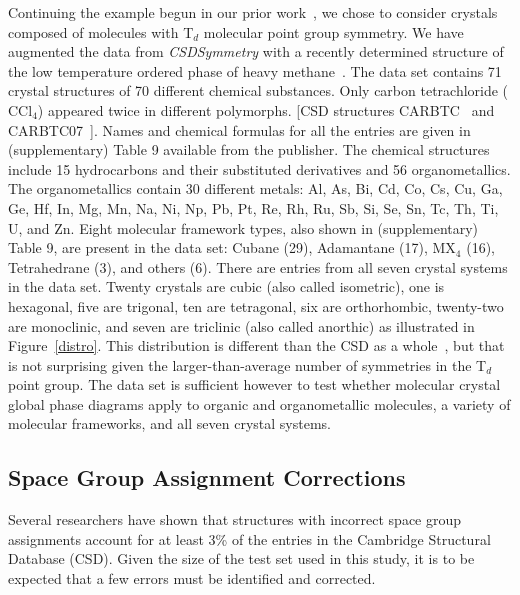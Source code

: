 \documentclass[preprint]{iucr}              %
\begin{document}
Continuing the example begun in our prior work~\cite{Mettes04}, we chose to consider crystals composed of molecules with T$_d$ molecular point group symmetry.  We have augmented the data from
\emph{CSDSymmetry} with a recently determined structure of the low temperature ordered phase of heavy methane~\cite{Neumann03}.  The data set contains 71 crystal structures of 70 different chemical substances.  Only carbon tetrachloride ($\mathrm{CCl}_4$) appeared twice in different polymorphs. [CSD structures CARBTC~\cite{Piermarini73} and CARBTC07~\cite{Cohen79}]. Names and chemical formulas for all the entries are given in (supplementary) Table 9 available from the publisher. The chemical structures include 15 hydrocarbons and their substituted derivatives and 56 organometallics. The organometallics contain 30 different metals: Al, As, Bi, Cd, Co, Cs, Cu, Ga, Ge, Hf, In, Mg, Mn, Na, Ni, Np, Pb, Pt, Re, Rh, Ru, Sb, Si, Se, Sn, Tc, Th, Ti, U, and Zn. Eight molecular framework types, also shown in (supplementary) Table 9, are present in the data set: Cubane (29), Adamantane (17), MX$_4$ (16), Tetrahedrane (3), and others (6). There are entries from all seven crystal systems in the data set. Twenty crystals are cubic (also called isometric), one is hexagonal, five are trigonal, ten are tetragonal, six are orthorhombic, twenty-two are monoclinic, and seven are triclinic (also called anorthic) as illustrated in Figure~\ref{distro}. This distribution is different than the CSD as a whole~\cite{Baur92}, but that is not surprising given the larger-than-average number of symmetries in the T$_d$ point group.  The data set is sufficient however to test whether molecular crystal global phase diagrams apply to organic and organometallic molecules, a variety of molecular frameworks, and all seven crystal systems.


\subsection{Space Group Assignment Corrections}
\label{corrections}

Several researchers have shown that structures with incorrect space group assignments account for at least 3\% of the entries in the Cambridge Structural Database (CSD).\cite{Baur86,Marsh95}  Given the size of the test set used in this study, it is to be expected that a few errors must be identified and corrected.
\end{document}
